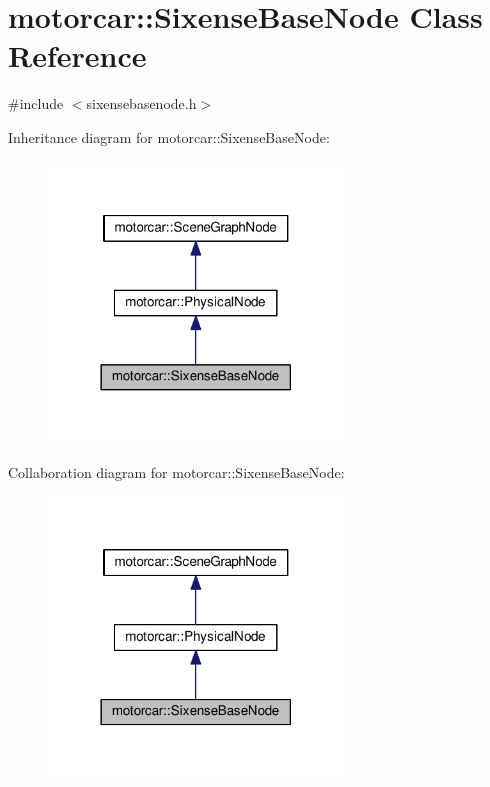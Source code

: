 \hypertarget{classmotorcar_1_1SixenseBaseNode}{\section{motorcar\-:\-:Sixense\-Base\-Node Class Reference}
\label{classmotorcar_1_1SixenseBaseNode}
}


{\ttfamily \#include $<$sixensebasenode.\-h$>$}



Inheritance diagram for motorcar\-:\-:Sixense\-Base\-Node\-:
\nopagebreak
\begin{figure}[H]
\begin{center}
\leavevmode
\includegraphics[width=222pt]{classmotorcar_1_1SixenseBaseNode__inherit__graph}
\end{center}
\end{figure}


Collaboration diagram for motorcar\-:\-:Sixense\-Base\-Node\-:
\nopagebreak
\begin{figure}[H]
\begin{center}
\leavevmode
\includegraphics[width=222pt]{classmotorcar_1_1SixenseBaseNode__coll__graph}
\end{center}
\end{figure}
